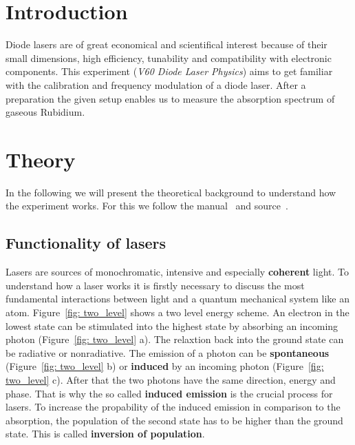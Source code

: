 \setcounter{page}{1}
\section*{Introduction}
Diode lasers are of great economical and scientifical interest because of their small dimensions, high efficiency, tunability and compatibility 
with electronic components. This experiment (\emph{V60 Diode Laser Physics}) aims to get familiar
with the calibration and frequency modulation of a diode laser. After a preparation the given setup enables us to measure
the absorption spectrum of gaseous Rubidium.

\section{Theory}
In the following we will present the theoretical background to understand how the experiment works. 
For this we follow the manual~\cite{anleitung60} and source~\cite{eichler}.

\subsection{Functionality of lasers}
Lasers are sources of monochromatic, intensive and especially \textbf{coherent} light.
To understand how a laser works it is firstly necessary to discuss the most fundamental interactions between light and
a quantum mechanical system like an atom. Figure~\ref{fig: two_level} shows a two level energy scheme. An electron in the
lowest state can be stimulated into the highest state by absorbing an incoming photon (Figure~\ref{fig: two_level} a). The relaxtion back into the
ground state can be radiative or nonradiative. 
The emission of a photon can be \textbf{spontaneous} (Figure~\ref{fig: two_level} b)
or \textbf{induced} by an incoming photon (Figure~\ref{fig: two_level} c). 
After that the two photons have the same direction, energy and phase.
That is why the so called \textbf{induced emission} is the crucial process for lasers. To increase the propability of the induced emission in
comparison to the absorption, the population of the second state has to be higher than the ground state. This is called
\textbf{inversion of population}.

